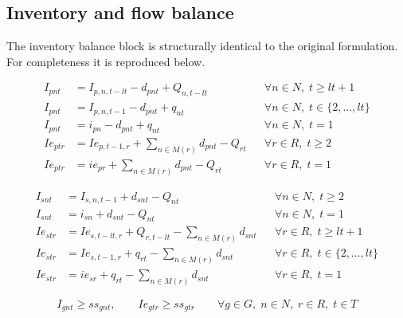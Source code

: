 \subsection*{Inventory and flow balance}

The inventory balance block is structurally identical to the original
formulation. For completeness it is reproduced below.

\begin{align}
I_{pnt}  &=I_{p,n,t-lt}-d_{pnt}+Q_{n,t-lt}
    &&\forall n\in N,\; t\ge lt+1
    \label{sb:eq:inv-plant-main}\\
I_{pnt}  &=I_{p,n,t-1}-d_{pnt}+q_{nt}
    &&\forall n\in N,\; t\in\{2,\dots,lt\}
    \label{sb:eq:inv-plant-transient}\\
I_{pnt}  &=i_{pn}-d_{pnt}+q_{nt}
    &&\forall n\in N,\; t=1
    \label{sb:eq:inv-plant-init}\\
Ie_{ptr} &=Ie_{p,t-1,r}+\sum_{n\in M(r)} d_{pnt}-Q_{rt}
    &&\forall r\in R,\; t\ge 2
    \label{sb:eq:inve-plant}\\
Ie_{ptr} &=ie_{pr}+\sum_{n\in M(r)} d_{pnt}-Q_{rt}
    &&\forall r\in R,\; t=1
    \label{sb:eq:inve-plant-init}
\end{align}

\begin{align}
I_{snt}  &=I_{s,n,t-1}+d_{snt}-Q_{nt}
    &&\forall n\in N,\; t\ge 2
    \label{sb:eq:inv-sup-main}\\
I_{snt}  &=i_{sn}+d_{snt}-Q_{nt}
    &&\forall n\in N,\; t=1
    \label{sb:eq:inv-sup-init}\\
Ie_{str} &=Ie_{s,t-lt,r}+Q_{r,t-lt}-\sum_{n\in M(r)} d_{snt}
    &&\forall r\in R,\; t\ge lt+1
    \label{sb:eq:inve-sup-main}\\
Ie_{str} &=Ie_{s,t-1,r}+q_{rt}-\sum_{n\in M(r)} d_{snt}
    &&\forall r\in R,\; t\in\{2,\dots,lt\}
    \label{sb:eq:inve-sup-transient}\\
Ie_{str} &=ie_{sr}+q_{rt}-\sum_{n\in M(r)} d_{snt}
    &&\forall r\in R,\; t=1
    \label{sb:eq:inve-sup-init}
\end{align}

\begin{equation}
I_{gnt}\ge ss_{gnt}, \qquad Ie_{gtr}\ge ss_{gtr}
\qquad \forall g\in G,\; n\in N,\; r\in R,\; t\in T
\label{sb:eq:safety}
\end{equation}

